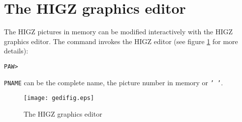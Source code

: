 \clearpage
\section{The HIGZ graphics editor}

The HIGZ pictures in memory can be modified interactively with the HIGZ
graphics editor. 
The command  invokes the HIGZ editor
(see figure \ref{fig:GEDIFIG} for more details):
\begin{alltt}
PAW > 
\end{alltt}
\texttt{PNAME} can be the complete name, the picture number in memory
or \texttt{' '}.

\begin{figure}
\texttt{[image: gedifig.eps]}
\caption{The HIGZ graphics editor}
\label{fig:GEDIFIG}
\end{figure}
